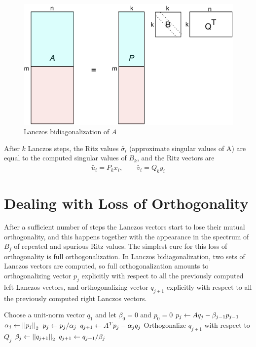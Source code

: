 \begin{figure}[tb]
    \centering
        \includegraphics[width=\textwidth]{figures/lanczos_bidiag_segment}
    \caption{Lanczos bidiagonalization of $A$}
    \label{fig:lanczos}
\end{figure}
After $k$ Lanczos steps, the Ritz values $\tilde{\sigma_i}$ (approximate singular
values of A) are equal to the computed singular values of $B_k$, and the
Ritz vectors are
\begin{gather*}
    \tilde{u_i} = P_k x_i,  \qquad  \tilde{v_i} = Q_k y_i
\end{gather*}

\section{Dealing with Loss of Orthogonality} %
\label{sec:dealing_with_loss_of_orthogonality}

After a sufficient number of steps the Lanczos vectors start to lose their
mutual orthogonality, and this happens together with the appearance in the
spectrum of $B_j$ of repeated and spurious Ritz values. The simplest cure for
this loss of orthogonality is full orthogonalization. In Lanczos
bidiagonalization, two sets of Lanczos vectors are computed, so full
orthogonalization amounts to orthogonalizing vector $p_j$ explicitly with
respect to all the previously computed left Lanczos vectors, and orthogonalizing
vector $q_{j+1}$ explicitly with respect to all the previously computed right
Lanczos vectors.

\begin{algorithm}
\begin{algorithmic}[1]
     \State Choose a unit-norm vector $q_1$ and let $\beta_0 = 0$ and $p_0 = 0$
        \State $p_j \leftarrow Aq_j - \beta_{j-1} p_{j-1}$
        \State $\alpha_j \leftarrow \left|\left|p_j\right|\right|_2$
        \State $p_j \leftarrow p_j/\alpha_j$
        \State $q_{j+1} \leftarrow A^Tp_j - \alpha_j q_j$
        \State Orthogonalize $q_{j+1}$ with respect to $Q_j$
        \State $\beta_j \leftarrow \left|\left|q_{j+1}\right|\right|_2$
        \State $q_{j+1} \leftarrow q_{j+1}/\beta_j$
    \EndFor
\end{algorithmic}
\end{algorithm}

